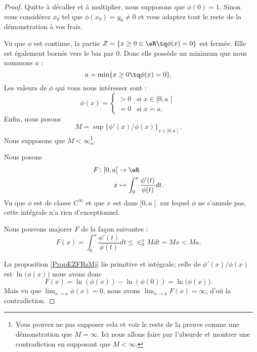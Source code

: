 \begin{proof}
	Quitte à décaller et à multiplier, nous supposons que \( \phi(0)=1\). Sinon vous considérez \( x_0\) tel que \( \phi(x_0)=y_0\neq 0\) et vous adaptez tout le reste de la démonstration à vos frais.

	Vu que \( \phi\) est continue, la partie \( Z=\{ x\geq 0\in \eR\tq \phi(x)=0 \}\) est fermée. Elle est également bornée vers le bas par \( 0\). Donc elle possède un minimum que nous nommons \( a\) :
	\begin{equation}
		a=\min\{ x\geq 0\tq \phi(x)=0 \}.
	\end{equation}
	Les valeurs de \( \phi\) qui vons nous intéresser sont :
	\begin{equation}
		\phi(x)=\begin{cases}
			>0 & \text{si } x\in\mathopen[ 0 , a \mathclose[ \\
			=0 & \text{si }x=a.
		\end{cases}
	\end{equation}
	Enfin, nous posons
	\begin{equation}
		M=\sup\{ \phi'(x)/\phi(x) \}_{x\in\mathopen[ 0 , a \mathclose[}.
	\end{equation}
	Nous supposons que \( M<\infty\)\footnote{Vous pouvez ne pas supposer cela et voir le reste de la preuve comme une démonstration que \( M=\infty\). Ici nous allons faire par l'absurde et montrer une contradiction en supposant que \( M<\infty\).}.

	Nous posons
	\begin{equation}
		\begin{aligned}
			F\colon \mathopen[ 0 , a \mathclose[ & \to \eR                                         \\
			x                                    & \mapsto \int_0^x\frac{ \phi'(t) }{ \phi(t) }dt.
		\end{aligned}
	\end{equation}
	Vu que \( \phi\) est de classe \(  C^{\infty}\) et que \( x\) est dans \( \mathopen[ 0 , a \mathclose[\) sur lequel \( \phi\) ne s'annule pas, cette intégrale n'a rien d'exceptionnel.

	Nous pouvons majorer \( F\) de la façon suivantes :
	\begin{equation}
		F(x)=\int_0^x\frac{ \phi'(t) }{ \phi(t) }dt\leq \in_0^xMdt=Mx< Ma.
	\end{equation}

	La proposition \ref{PropEZFRsMj} lie primitive et intégrale; celle de \( \phi'(x)/\phi(x)\) est \( \ln\big( \phi(x) \big)\) nous avons donc
	\begin{equation}        \label{EQooCEVKooLgXiaj}
		F(x)=\ln(\phi(x))-\ln(\phi(0))=\ln\big( \phi(x) \big).
	\end{equation}
	Mais vu que \( \lim_{x\to a} \phi(x)=0\), nous avons \( \lim_{x\to a} F(x)=\infty\), d'où la contradiction.
\end{proof}

